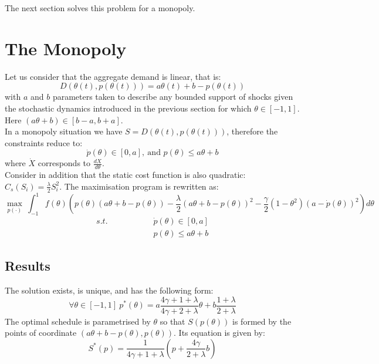 The next section solves this problem for a monopoly. 



\section{The Monopoly}\label{monosolve}
Let us consider that the aggregate demand is linear, that is: $$D(\theta(t),p(\theta(t)))=a\theta(t)+b-p(\theta(t))$$
with $a$ and $b$ parameters taken to describe any bounded support of shocks given the stochastic dynamics introduced in the previous section for which $\theta\in[-1,1]$. Here $(a\theta+b)\in[b-a,b+a]$.\\

In a monopoly situation we have $S=D(\theta(t),p(\theta(t)))$, therefore the constraints reduce to: $$\dot{p}(\theta)\in[0,a],~\textrm{and }p(\theta)\leq a\theta+b$$
where $\dot{X}$ corresponds to $\frac{dX}{d\theta}$. \\

Consider in addition that the static cost function is also quadratic: $C_s(S_i)=\frac{\lambda}{2}S_i^2$. The maximisation program is rewritten as: 
\begin{equation}
\displaystyle{\max_{p(\cdot)}}~\int_{-1}^{1} f(\theta)\left(p(\theta)(a\theta+b-p(\theta)) -\frac{\lambda}{2}(a\theta+b-p(\theta))^2-\frac{\gamma}{2}(1-\theta^2)\left(a-\dot{p}(\theta)\right)^2\right)d\theta
\end{equation}
\begin{eqnarray}
s.t.\hspace{2cm}&\dot{p}(\theta)\in[0,a] \nonumber\\
&p(\theta)\leq a\theta+b \nonumber
\end{eqnarray}


\subsection{Results}
\begin{proposition}\label{monopequilibria}
The solution exists, is unique, and has the following form:
\begin{equation}
\forall \theta \in [-1,1]~p^*(\theta)=a\frac{4\gamma+1+\lambda}{4\gamma+2+\lambda}\theta+ b\frac{1+\lambda}{2+\lambda} \label{monopsol}
\end{equation}
The optimal schedule is parametrised by $\theta$ so that $S(p(\theta))$ is formed by the points of coordinate $(a\theta+b-p(\theta),p(\theta))$. Its equation is given by:
\begin{equation}
S^*(p)=\frac{1}{4\gamma+1+\lambda}\left(p+\frac{4\gamma}{2+\lambda}b\right) \label{monopS}
\end{equation}
\end{proposition}

